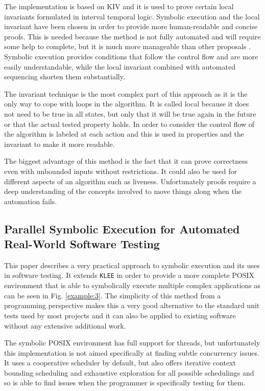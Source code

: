 \documentclass[10pt]{llncs}
\begin{document}
The implementation is based on KIV and it is used to prove certain local invariants formulated in interval temporal logic. Symbolic execution and the local invariant have been chosen in order to provide more human-readable and concise proofs. This is needed because the method is not fully automated and will require some help to complete, but it is much more manageable than other proposals \cite{base2:14, base2:15}. Symbolic execution provides conditions that follow the control flow and are more easily understandable, while the local invariant combined with automated sequencing shorten them substantially.

The invariant technique is the most complex part of this approach as it is the only way to cope with loops in the algorithm. It is called local because it does not need to be true in all states, but only that it will be true again in the future or that the actual tested property holds. In order to consider the control flow of the algorithm is labeled at each action and this is used in properties and the invariant to make it more readable.

The biggest advantage of this method is the fact that it can prove correctness even with unbounded inputs without restrictions. It could also be used for different aspects of an algorithm such as liveness. Unfortunately proofs require a deep understanding of the concepts involved to move things along when the automation fails.

\subsection{Parallel Symbolic Execution for Automated Real-World Software Testing \cite{base3}}

This paper describes a very practical approach to symbolic execution and its uses in software testing. It extends \texttt{KLEE} \cite{klee} in order to provide a more complete POSIX environment that is able to symbolically execute multiple complex applications as can be seen in Fig. \ref{example:3}. The simplicity of this method from a programming perspective makes this a very good alternative to the standard unit tests used by most projects and it can also be applied to existing software without any extensive additional work.

The symbolic POSIX environment has full support for threads, but unfortunately this implementation is not aimed specifically at finding subtle concurrency issues. It uses a cooperative scheduler by default, but also offers iterative context bounding scheduling \cite{Musuvathi} and exhaustive exploration for all possible schedulings and so is able to find issues when the programmer is specifically testing for them.
\end{document}
